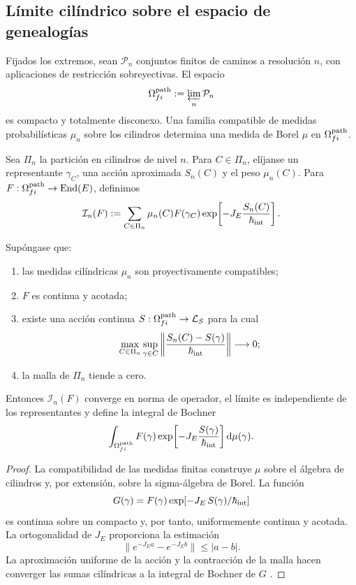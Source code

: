 \subsection{Límite cilíndrico sobre el espacio de genealogías}

Fijados los extremos, sean \(\mathcal P_n\) conjuntos finitos de caminos a
resolución \(n\), con aplicaciones de restricción sobreyectivas. El espacio
\[
 \Omega^{\rm path}_{fi}:=\varprojlim_n\mathcal P_n
\]
es compacto y totalmente disconexo. Una familia compatible de medidas
probabilísticas \(\mu_n\) sobre los cilindros determina una medida de Borel
\(\mu\) en \(\Omega^{\rm path}_{fi}\).

Sea \(\Pi_n\) la partición en cilindros de nivel \(n\). Para
\(C\in\Pi_n\), elíjanse un representante \(\gamma_C\), una acción aproximada
\(S_n(C)\) y el peso \(\mu_n(C)\). Para
\(F:\Omega^{\rm path}_{fi}\to\operatorname{End}(E)\), definimos
\begin{equation}
 \mathcal I_n(F)
 :=\sum_{C\in\Pi_n}\mu_n(C)F(\gamma_C)
 \exp\!\left[-J_E\frac{S_n(C)}{\hbar_{\rm int}}\right].
 \label{eq:integral-cilindrica-aproximante-rev2}
\end{equation}

\begin{theorem}
\label{thm:integral-genealogica-caminos-rev2}
Supóngase que:
\begin{enumerate}
 \item las medidas cilíndricas \(\mu_n\) son proyectivamente compatibles;
 \item \(F\) es continua y acotada;
 \item existe una acción continua
 \(S:\Omega^{\rm path}_{fi}\to\mathcal L_S\) para la cual
 \[
  \max_{C\in\Pi_n}\sup_{\gamma\in C}
  \left\|\frac{S_n(C)-S(\gamma)}{\hbar_{\rm int}}\right\|
  \longrightarrow0;
 \]
 \item la malla de \(\Pi_n\) tiende a cero.
\end{enumerate}
Entonces \(\mathcal I_n(F)\) converge en norma de operador, el límite es
independiente de los representantes y define la integral de Bochner
\begin{equation}
 \int_{\Omega^{\rm path}_{fi}}
 F(\gamma)
 \exp\!\left[-J_E\frac{S(\gamma)}{\hbar_{\rm int}}\right]
 \mathrm d\mu(\gamma).
 \label{eq:integral-genealogica-caminos-rev2}
\end{equation}
\end{theorem}

\begin{proof}
La compatibilidad de las medidas finitas construye \(\mu\) sobre el álgebra
de cilindros y, por extensión, sobre la sigma-álgebra de Borel. La función
\[
 G(\gamma)=F(\gamma)
 \exp[-J_E\,S(\gamma)/\hbar_{\rm int}]
\]
es continua sobre un compacto y, por tanto, uniformemente continua y
acotada. La ortogonalidad de \(J_E\) proporciona la estimación
\[
 \|e^{-J_E a}-e^{-J_E b}\|\leq |a-b|.
\]
La aproximación uniforme de la acción y la contracción de la malla hacen
converger las sumas cilíndricas a la integral de Bochner de \(G\)
\cite{Bochner1955}.
\end{proof}

